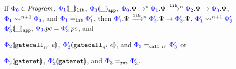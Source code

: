 \begin{theorem} \label{thm:overlay-confidentiality-soundness}
  If $\oc{\Phi_0} \in \programs$, $\currentcom{\oc{\Phi_1}}{\_}{\untrusted}$,
  $\currentcom{\oc{\Phi_3}}{\_}{\trusted}$, $\oc{\Phi_0}.\Psi \stepstar
  \oc{\Phi_1}.\Psi \steplown{n} \oc{\Phi_2}.\Psi \step \oc{\Phi_3}.\Psi$,
  $\oc{\Phi_1} \ostepn{n + 1} \oc{\Phi_3}$, and $\oc{\Phi_1} =_{\untrusted}
  \oc{\Phi_1'}$,
  then $\oc{\Phi_1'}.\Psi \steplown{n} \oc{\Phi_2'}.\Psi \step \oc{\Phi_3'}.\Psi$,
  $\oc{\Phi_1'} \ostepn{n + 1} \oc{\Phi_3'}$
  $\currentcom{\oc{\Phi_3'}}{\_}{\trusted}$, $\oc{\Phi_3}.pc = \oc{\Phi_3'}.pc$,
  and
  \begin{enumerate*}
  \item $\currentop{\oc{\Phi_2}}{\cgatecall{n'}{e}}$, $\currentop{\oc{\Phi_2'}}{\cgatecall{n'}{e}}$, and $\oc{\Phi_3} =_{\mathtt{call}\ n'} \oc{\Phi_3'}$ or
  \item $\currentop{\oc{\Phi_2}}{\cgateret}$, $\currentop{\oc{\Phi_2'}}{\cgateret}$, and $\oc{\Phi_3} =_{\mathtt{ret}} \oc{\Phi_3'}$.
  \end{enumerate*}
\end{theorem}